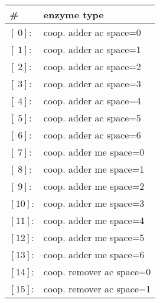             \begin{figure}[htpb!]
                \centering
                \vspace{.3cm}
                \begin{center}
                \small
                \begin{minipage}{.45\textwidth}
                    \begin{tabular}{l l}
                        \hline
                        \textbf{\#} & \textbf{enzyme type} \\
                        \hline
                        $[\ 0]$: & coop. adder ac space=0 \\
                        $[\ 1]$: & coop. adder ac space=1 \\
                        $[\ 2]$: & coop. adder ac space=2 \\
                        $[\ 3]$: & coop. adder ac space=3 \\
                        $[\ 4]$: & coop. adder ac space=4 \\
                        $[\ 5]$: & coop. adder ac space=5 \\
                        $[\ 6]$: & coop. adder ac space=6 \\\hline
                        $[\ 7]$: & coop. adder me space=0 \\
                        $[\ 8]$: & coop. adder me space=1 \\
                        $[\ 9]$: & coop. adder me space=2 \\
                        $[10]$: & coop. adder me space=3 \\
                        $[11]$: & coop. adder me space=4 \\
                        $[12]$: & coop. adder me space=5 \\
                        $[13]$: & coop. adder me space=6 \\\hline
                        $[14]$: & coop. remover ac space=0 \\
                        $[15]$: & coop. remover ac space=1 \\
                    \end{tabular}
                \end{minipage}
                \hfill
                \begin{minipage}{.45\textwidth}

\end{minipage}
\end{center}
\end{figure}
